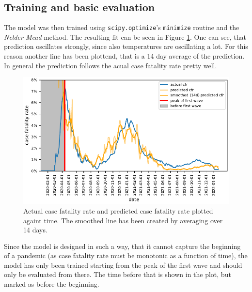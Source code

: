 \documentclass{article}
\begin{document}
\subsection{Training and basic evaluation}

The model was then trained using \texttt{scipy.optimize}'s \texttt{minimize} routine and the \textit{Nelder-Mead} method. The resulting fit can be seen in Figure \ref{fig:prediction}. One can see, that prediction oscillates strongly, since also temperatures are oscillating a lot. For this reason another line has been plottend, that is a 14 day average of the prediction. In general the prediction follows the acual case fatality rate pretty well.

\begin{figure}[hbt!]
  \begin{center}
    \includegraphics{../fig/prediction.pdf}
    \caption{Actual case fatality rate and predicted case fatality rate plotted againt time. The smoothed line has been created by averaging over 14 days.}
    \label{fig:prediction}
  \end{center}
\end{figure} 

Since the model is designed in such a way, that it cannot capture the beginning of a pandemic (as case fatality rate must be monotonic as a function of time), the model has only been trained starting from the peak of the first wave and should only be evaluated from there. The time before that is shown in the plot, but marked as before the beginning. 

\end{document}
